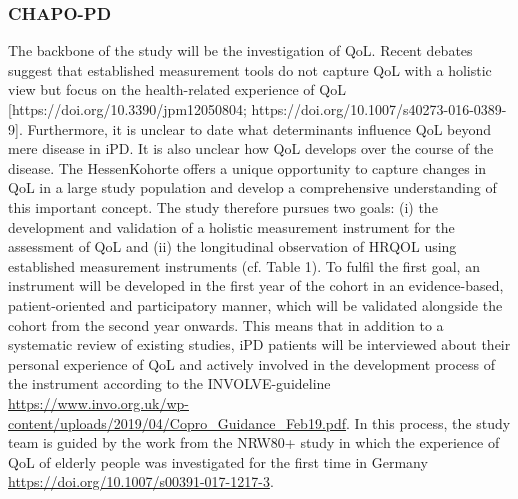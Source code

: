 \subsubsection{\acl{CHAPO-PD}}
\label{questionnaires:chapo}
The backbone of the study will be the investigation of \ac{QoL}. Recent debates suggest that established measurement tools do not capture \ac{QoL} with a holistic view but focus on the health-related experience of \ac{QoL} [https://doi.org/10.3390/jpm12050804; https://doi.org/10.1007/s40273-016-0389-9]. Furthermore, it is unclear to date what determinants influence \ac{QoL} beyond mere disease in \ac{iPD}. It is also unclear how \ac{QoL} develops over the course of the disease. The HessenKohorte offers a unique opportunity to capture changes in \ac{QoL} in a large study population and develop a comprehensive understanding of this important concept. The study therefore pursues two goals: (i) the development and validation of a holistic measurement instrument for the assessment of \ac{QoL} and (ii) the longitudinal observation of \ac{HRQOL} using established measurement instruments (cf. Table 1). 
To fulfil the first goal, an instrument will be developed in the first year of the cohort in an evidence-based, patient-oriented and participatory manner, which will be validated alongside the cohort from the second year onwards.  This means that in addition to a systematic review of existing studies, \ac{iPD} patients will be interviewed about their personal experience of \ac{QoL} and actively involved in the development process of the instrument according to the INVOLVE-guideline \url{https://www.invo.org.uk/wp-content/uploads/2019/04/Copro_Guidance_Feb19.pdf}. In this process, the study team is guided by the work from the NRW80+ study in which the experience of \ac{QoL} of elderly people was investigated for the first time in Germany \url{https://doi.org/10.1007/s00391-017-1217-3}.

